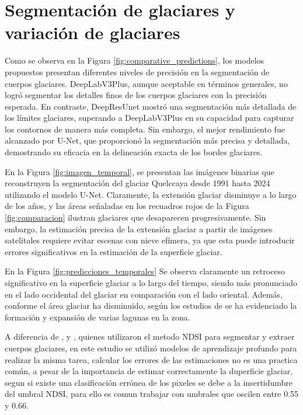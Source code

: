 \section{Segmentación de glaciares y variación de glaciares}

Como se observa en la Figura \ref{fig:comparative_predictions}, los modelos propuestos presentan diferentes niveles de precisión en la segmentación de cuerpos glaciares. DeepLabV3Plus, aunque aceptable en términos generales, no logró segmentar los detalles finos de los cuerpos glaciares con la precisión esperada. En contraste, DeepResUnet mostró una segmentación más detallada de los límites glaciares, superando a DeepLabV3Plus en su capacidad para capturar los contornos de manera más completa. Sin embargo, el mejor rendimiento fue alcanzado por U-Net, que proporcionó la segmentación más precisa y detallada, demostrando su eficacia en la delineación exacta de los bordes glaciares.

En la Figura \ref{fig:imagen_temporal}, se presentan las imágenes binarias que reconstruyen la segmentación del glaciar Quelccaya desde 1991 hasta 2024 utilizando el modelo U-Net. Claramente, la extensión glaciar disminuye a lo largo de los años, y las áreas señaladas en los recuadros rojos de la Figura \ref{fig:comparacion} ilustran glaciares que desaparecen progresivamente. Sin embargo, la estimación precisa de la extensión glaciar a partir de imágenes satelitales requiere evitar escenas con nieve efímera, ya que esta puede introducir errores significativos en la estimación de la superficie glaciar. 


En la Figura \ref{fig:predicciones_temporales} Se observa claramente un retroceso significativo en la superficie glaciar a lo largo del tiempo, siendo más pronunciado en el lado occidental del glaciar en comparación con el lado oriental. Además, conforme el área glaciar ha disminuido, según los estudios de \parencite{inaigem2023} se ha evidenciado la formación y expansión de varias lagunas en la zona.

A diferencia de \parencite{malone2022evolution}, \parencite{taylor2022multi} y \parencite{hanshaw2014glacial}, quienes utilizaron el metodo NDSI para segmentar y extraer cuerpos glaciares, en este estudio se utilizó modelos de aprendizaje profundo para realizar la misma tarea, calcular los errores de las estimaciones no es una practica común, a pesar de la importancia de estimar correctamente la duperficie glaciar, segun \parencite{montoya2024estimation} si existe una clasificación errónea de los pixeles se debe a la insertidumbre del umbral NDSI, para ello es comun trabajar con umbrales que oscilen entre 0.55 y 0.66.

